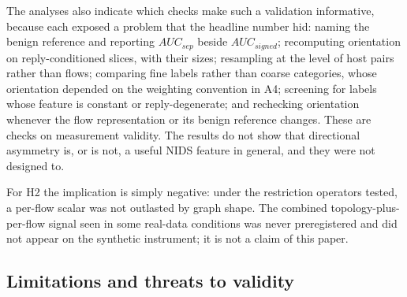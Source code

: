 \documentclass[preprint,12pt]{elsarticle}
\begin{document}
The analyses also indicate which checks make such a validation informative, because each exposed a problem that the headline number hid: naming the benign reference and reporting $AUC_{sep}$ beside $AUC_{signed}$; recomputing orientation on reply-conditioned slices, with their sizes; resampling at the level of host pairs rather than flows; comparing fine labels rather than coarse categories, whose orientation depended on the weighting convention in A4; screening for labels whose feature is constant or reply-degenerate; and rechecking orientation whenever the flow representation or its benign reference changes. These are checks on measurement validity. The results do not show that directional asymmetry is, or is not, a useful NIDS feature in general, and they were not designed to.

For H2 the implication is simply negative: under the restriction operators tested, a per-flow scalar was not outlasted by graph shape. The combined topology-plus-per-flow signal seen in some real-data conditions was never preregistered and did not appear on the synthetic instrument; it is not a claim of this paper.

\subsection{Limitations and threats to validity}\label{sec:limitations}
\end{document}
